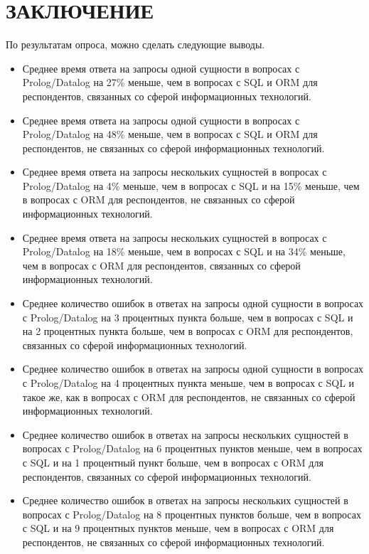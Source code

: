 \chapter*{ЗАКЛЮЧЕНИЕ}

По результатам опроса, можно сделать следующие выводы.

\begin{itemize}
	\item Среднее время ответа на запросы одной сущности в вопросах с Prolog/Datalog на 27\% меньше, чем в вопросах с SQL и ORM для респондентов, связанных со сферой информационных технологий.
	\item Среднее время ответа на запросы одной сущности в вопросах с Prolog/Datalog на 48\% меньше, чем в вопросах с SQL и ORM для респондентов, не связанных со сферой информационных технологий.
	\item Среднее время ответа на запросы нескольких сущностей в вопросах с Prolog/Datalog на 4\% меньше, чем в вопросах с SQL и на 15\% меньше, чем в вопросах с ORM для респондентов, не связанных со сферой информационных технологий.
	\item Среднее время ответа на запросы нескольких сущностей в вопросах с Prolog/Datalog на 18\% меньше, чем в вопросах с SQL и на 34\% меньше, чем в вопросах с ORM для респондентов, связанных со сферой информационных технологий.
	\item Среднее количество ошибок в ответах на запросы одной сущности в вопросах с Prolog/Datalog на 3 процентных пункта больше, чем в вопросах с SQL и на 2 процентных пункта больше, чем в вопросах с ORM для респондентов, связанных со сферой информационных технологий.
	\item Среднее количество ошибок в ответах на запросы одной сущности в вопросах с Prolog/Datalog на 4 процентных пункта меньше, чем в вопросах с SQL и такое же, как в вопросах с ORM для респондентов, не связанных со сферой информационных технологий.
	\item Среднее количество ошибок в ответах на запросы нескольких сущностей в вопросах с Prolog/Datalog на 6 процентных пунктов меньше, чем в вопросах с SQL и на 1 процентный пункт больше, чем в вопросах с ORM для респондентов, связанных со сферой информационных технологий.
	\item Среднее количество ошибок в ответах на запросы нескольких сущностей в вопросах с Prolog/Datalog на 8 процентных пунктов больше, чем в вопросах с SQL и на 9 процентных пунктов меньше, чем в вопросах с ORM для респондентов, не связанных со сферой информационных технологий.
\end{itemize}

